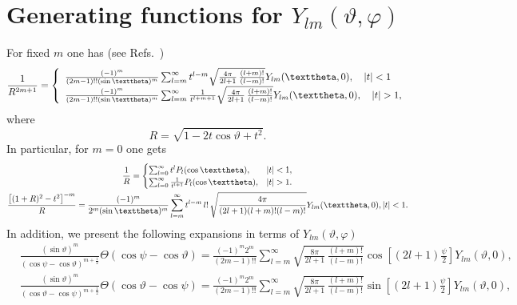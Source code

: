 \section{Generating functions for $Y_{l m}(\vartheta, \varphi)$}\label{sec:5.11}
For fixed $m$ one has (see Refs.~\cite{ref004, ref022})
\begin{equation}
\frac{1}{R^{2 m+1}}=\renewcommand{\arraystretch}{1.5}\left\{\begin{array}{l}
\frac{(-1)^{m}}{(2 m-1)!!(\sin \vartheta)^{m}} \sum_{l=m}^{\infty} t^{l-m} \sqrt{\frac{4 \pi}{2 l+1} \, \frac{(l+m)!}{(l-m)!}} Y_{l m}(\vartheta, 0),\quad|t|<1 \\
\frac{(-1)^{m}}{(2 m-1)!!(\sin \vartheta)^{m}} \sum_{l=m}^{\infty} \frac{1}{t^{l+m+1}} \sqrt{\frac{4 \pi}{2 l+1} \, \frac{(l+m)!}{(l-m)!}} Y_{l m}(\vartheta, 0),\quad |t|>1,
\end{array}\right. \label{eq:5:11:1}
\end{equation}
where
\[
R=\sqrt{1-2 t \cos \vartheta+t^{2}}.
\]
In particular, for $m=0$ one gets
\begin{gather}\renewcommand{\arraystretch}{1.5}
\frac{1}{R}= \begin{cases}\sum_{l=0}^{\infty} t^{l} P_{l}(\cos \vartheta), & |t|<1, \\
\sum_{l=0}^{\infty} \frac{1}{t^{l+1}} P_{l}(\cos \vartheta), & |t|>1 .\end{cases}  \label{eq:5:11:2}\\
\frac{\left[(1+R)^{2}-t^{2}\right]^{-m}}{R}=\frac{(-1)^{m}}{2^{m}(\sin \vartheta)^{m}} \sum_{l=m}^{\infty} t^{l-m} \, l! \, \sqrt{\frac{4 \pi}{(2 l+1)(l+m)!(l-m)!}} Y_{l m}(\vartheta, 0),|t|<1 . \label{eq:5:11:3}
\end{gather}
In addition, we present the following expansions in terms of $Y_{l m}(\vartheta, \varphi)$ \cite{ref004}
\begin{align}
& \frac{(\sin \vartheta)^{m}}{(\cos \psi-\cos \vartheta)^{m+\frac{1}{2}}} \Theta(\cos \psi-\cos \vartheta)=\frac{(-1)^{m} 2^{m}}{(2 m-1)!!} \sum_{l=m}^{\infty} \sqrt{\frac{8 \pi}{2 l+1} \, \frac{(l+m)!}{(l-m)!}} \cos \left[(2 l+1) \frac{\psi}{2}\right] Y_{l m}(\vartheta, 0) , \label{eq:5:11:4}\\
& \frac{(\sin \vartheta)^{m}}{(\cos \vartheta-\cos \psi)^{m+\frac{1}{2}}} \Theta(\cos \vartheta-\cos \psi)=\frac{(-1)^{m} 2^{m}}{(2 m-1)!!} \sum_{l=m}^{\infty} \sqrt{\frac{8 \pi}{2 l+1} \, \frac{(l+m)!}{(l-m)!}} \sin \left[(2 l+1) \frac{\psi}{2}\right] Y_{l m}(\vartheta, 0), \label{eq:5:11:5}
\end{align}
